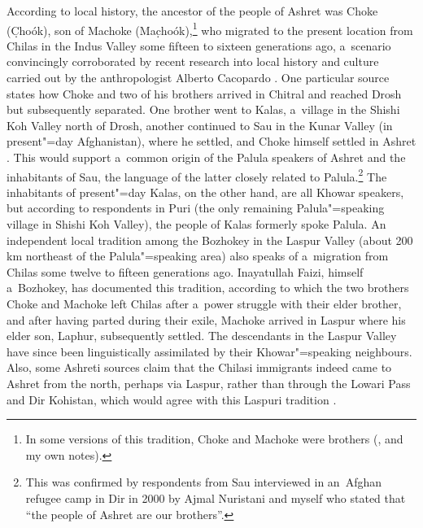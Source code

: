 According to local history, the ancestor of the people of Ashret was Choke (C̣hoók), son of
Machoke (Mac̣hoók),\footnote{In some versions of this tradition, Choke and Machoke were brothers
  (\citealt[85]{cacopardo2001}, and my own notes).} who migrated to the present location from
Chilas in the Indus Valley some fifteen to sixteen generations ago, a~scenario convincingly corroborated by
recent research into local history and culture carried out by the anthropologist Alberto Cacopardo
\citep[84--93]{cacopardo2001}. One particular source states how Choke and two of his brothers
arrived in Chitral and reached Drosh but subsequently separated. One brother went to Kalas,
a~village in the Shishi Koh Valley north of Drosh, another continued to Sau in the Kunar Valley (in
present"=day Afghanistan), where he settled, and Choke himself settled in Ashret
\citep[84]{cacopardo2001}. This would support a~common origin of the Palula speakers of Ashret and
the inhabitants of Sau, the language of the latter closely related to Palula.\footnote{This was
  confirmed by respondents from Sau interviewed in an~Afghan refugee camp in Dir in 2000 by Ajmal
  Nuristani and myself who stated that ``the people of Ashret are our brothers''.} The inhabitants
of present"=day Kalas, on the other hand, are all Khowar speakers, but according to respondents in
Puri (the only remaining Palula"=speaking village in Shishi Koh Valley), the people of Kalas formerly
spoke Palula. An independent local tradition among the Bozhokey in the Laspur Valley (about 200 km
northeast of the Palula"=speaking area) also speaks of a~migration from Chilas some twelve to fifteen
generations ago. Inayatullah Faizi, himself a~Bozhokey, has documented this tradition, according
to which the two brothers Choke and Machoke left Chilas after a~power struggle with their elder
brother, and after having parted during their exile, Machoke arrived in Laspur where his elder son,
Laphur, subsequently settled. The descendants in the Laspur Valley have since been linguistically
assimilated by their Khowar"=speaking neighbours. Also, some Ashreti sources claim that the Chilasi
immigrants indeed came to Ashret from the north, perhaps via Laspur, rather than through the Lowari
Pass and Dir Kohistan, which would agree with this Laspuri tradition \citep[85, 125--126]{cacopardo2001}.


